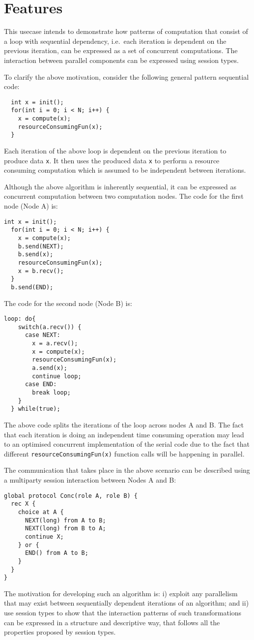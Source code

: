 \section{Features}

This usecase intends to demonstrate how patterns of
computation that consist of a loop with sequential
dependency, i.e.~each iteration is dependent on the
previous iteration, can be expressed as a set of 
concurrent computations. The interaction between 
parallel components can be expressed using session types.


To clarify the above motivation, consider the following general pattern
sequential code:
%
\begin{lstlisting}
  int x = init();
  for(int i = 0; i < N; i++) {
    x = compute(x);
    resourceConsumingFun(x);
  }
\end{lstlisting}
%
Each iteration of the above loop is dependent on
the previous iteration to produce data \lstinline|x|.
It then uses the produced data \lstinline|x| to perform
a resource consuming computation which is assumed to
be independent between iterations.

Although the above algorithm is inherently sequential,
it can be expressed as concurrent computation between
two computation nodes. The code for the first node
(Node A) is:
%
\begin{lstlisting}[caption={Code for Node A}]
  int x = init();
  for(int i = 0; i < N; i++) {
    x = compute(x);
    b.send(NEXT);
    b.send(x);
    resourceConsumingFun(x);
    x = b.recv();
  }
  b.send(END);
\end{lstlisting}
%
The code for the second node (Node B) is:
%
\begin{lstlisting}[caption={Code for Node B}]
  loop: do{
    switch(a.recv()) {
      case NEXT:
        x = a.recv();
        x = compute(x);
        resourceConsumingFun(x);
        a.send(x);
        continue loop;
      case END:
        break loop;
    }
  } while(true);
\end{lstlisting}

The above code splits the iterations of the loop across
nodes A and B. The fact that each iteration is doing
an independent time consuming operation may lead to
an optimised concurrent implementation of the serial
code due to the fact that different \lstinline|resourceConsumingFun(x)|
function calls will be happening in parallel.

The communication that takes place in the above scenario
can be described using a multiparty session interaction
between Nodes A and B:
\begin{lstlisting}[caption={Global Protocol}]
global protocol Conc(role A, role B) {
  rec X {
    choice at A {
      NEXT(long) from A to B;
      NEXT(long) from B to A;
      continue X;
    } or {
      END() from A to B;
    }
  }
}
\end{lstlisting}
%
The motivation for developing such an algorithm is:
i) exploit any parallelism that may exist between
sequentially dependent iterations of an algorithm; and
ii) use session types to show that the interaction
patterns of such transformations can be expressed in
a structure and descriptive way, that follows all the
properties proposed by session types. 

